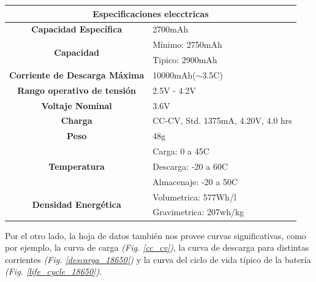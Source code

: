 \documentclass[10pt,a4paper]{article}
\begin{document}
	\begin{table}[h!]
		\begin{center}
			\begin{tabular}{|c|l|}
				\hline
                \multicolumn{2}{|c|}{Especificaciones elecctricas}                          \\ \hline
				\textbf{Capacidad Específica}                 & 2700mAh                            \\ \hline
				\multirow{2}{*}{\textbf{Capacidad}}           & Mínimo: 2750mAh                    \\ \cline{2-2} 
				& Tipico: 2900mAh                    \\ \hline
				\textbf{Corriente de Descarga Máxima}         & 10000mAh($\sim$3.5C)               \\ \hline
				\textbf{Rango operativo de tensión}           & 2.5V - 4.2V                        \\ \hline
				\textbf{Voltaje Nominal}                      & 3.6V                               \\ \hline
				\textbf{Charga}                               & CC-CV, Std. 1375mA, 4.20V, 4.0 hrs \\ \hline
				\textbf{Peso}                                 & 48g                              \\ \hline
				\multirow{3}{*}{\textbf{Temperatura}}         & Carga: 0 a 45C                     \\ \cline{2-2} 
				& Descarga: -20 a 60C                \\ \cline{2-2} 
				& Almacenaje: -20 a 50C              \\ \hline
				\multirow{2}{*}{\textbf{Densidad Energética}} & Volumetrica: 577Wh/l               \\ \cline{2-2} 
				& Gravimetrica: 207wh/kg             \\ \hline
			\end{tabular}%
		\end{center}
	\end{table}
	
	Por el otro lado, la hoja de datos también nos provee curvas significativas, 
    como por ejemplo, la curva de carga \emph{(Fig. \ref{cc_cv})}, 
    la curva de descarga para distintas corrientes 
    \emph{(Fig. \ref{descarga_18650})} y la curva del ciclo de vida típico de 
    la batería \emph{(Fig. \ref{life_cycle_18650})}.

    \clearpage
	
\end{document}
